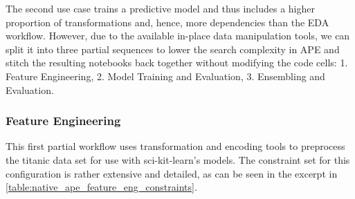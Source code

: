 The second use case trains a predictive model and thus includes a higher proportion of transformations and, hence, more dependencies than the EDA workflow. However, due to the available in-place data manipulation tools, we can split it into three partial sequences to lower the search complexity in APE and stitch the resulting notebooks back together without modifying the code cells: 1. Feature Engineering, 2. Model Training and Evaluation, 3. Ensembling and Evaluation.

\subsubsection{Feature Engineering}

This first partial workflow uses transformation and encoding tools to preprocess the titanic data set for use with sci-kit-learn's models. The constraint set for this configuration is rather extensive and detailed, as can be seen in the excerpt in \autoref{table:native_ape_feature_eng_constraints}.

